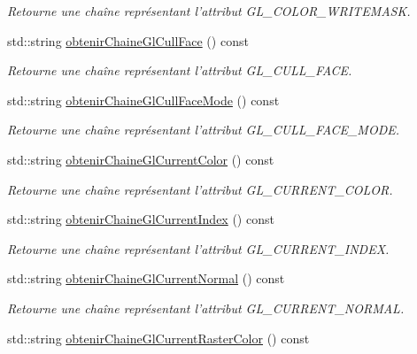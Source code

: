 \begin{DoxyCompactItemize}
\begin{DoxyCompactList}\small\item\em Retourne une chaîne représentant l'attribut G\-L\-\_\-\-C\-O\-L\-O\-R\-\_\-\-W\-R\-I\-T\-E\-M\-A\-S\-K. \end{DoxyCompactList}\item 
std\-::string \hyperlink{group__utilitaire_ga6c53044cfb9b67582efe6415ff1f1f49}{obtenir\-Chaine\-Gl\-Cull\-Face} () const 
\begin{DoxyCompactList}\small\item\em Retourne une chaîne représentant l'attribut G\-L\-\_\-\-C\-U\-L\-L\-\_\-\-F\-A\-C\-E. \end{DoxyCompactList}\item 
std\-::string \hyperlink{group__utilitaire_ga0601a9f84791de8e9ab33841308ecea0}{obtenir\-Chaine\-Gl\-Cull\-Face\-Mode} () const 
\begin{DoxyCompactList}\small\item\em Retourne une chaîne représentant l'attribut G\-L\-\_\-\-C\-U\-L\-L\-\_\-\-F\-A\-C\-E\-\_\-\-M\-O\-D\-E. \end{DoxyCompactList}\item 
std\-::string \hyperlink{group__utilitaire_gabe349174d65850291bc46f7b524dac44}{obtenir\-Chaine\-Gl\-Current\-Color} () const 
\begin{DoxyCompactList}\small\item\em Retourne une chaîne représentant l'attribut G\-L\-\_\-\-C\-U\-R\-R\-E\-N\-T\-\_\-\-C\-O\-L\-O\-R. \end{DoxyCompactList}\item 
std\-::string \hyperlink{group__utilitaire_ga222790a07e4a9cacfbe2f68cd97fd8d9}{obtenir\-Chaine\-Gl\-Current\-Index} () const 
\begin{DoxyCompactList}\small\item\em Retourne une chaîne représentant l'attribut G\-L\-\_\-\-C\-U\-R\-R\-E\-N\-T\-\_\-\-I\-N\-D\-E\-X. \end{DoxyCompactList}\item 
std\-::string \hyperlink{group__utilitaire_gac6c54789d936998634ad29c80e150d92}{obtenir\-Chaine\-Gl\-Current\-Normal} () const 
\begin{DoxyCompactList}\small\item\em Retourne une chaîne représentant l'attribut G\-L\-\_\-\-C\-U\-R\-R\-E\-N\-T\-\_\-\-N\-O\-R\-M\-A\-L. \end{DoxyCompactList}\item 
std\-::string \hyperlink{group__utilitaire_ga62ef22c97a3ecc8c7e956f2fd7267b9d}{obtenir\-Chaine\-Gl\-Current\-Raster\-Color} () const 

\end{DoxyCompactItemize}
